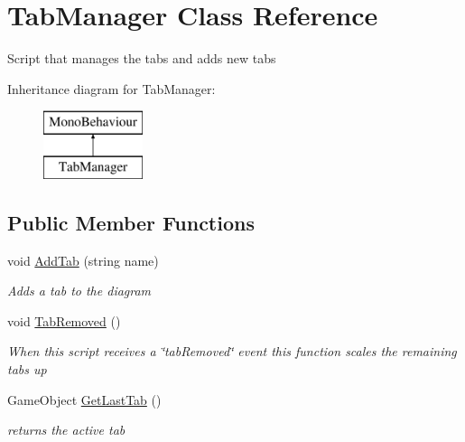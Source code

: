 \hypertarget{class_tab_manager}{}\section{Tab\+Manager Class Reference}
\label{class_tab_manager}


Script that manages the tabs and adds new tabs  


Inheritance diagram for Tab\+Manager\+:\begin{figure}[H]
\begin{center}
\leavevmode
\includegraphics[height=2.000000cm]{class_tab_manager}
\end{center}
\end{figure}
\subsection*{Public Member Functions}
\begin{DoxyCompactItemize}
\item 
void \hyperlink{class_tab_manager_addabe80f37af16c101517e0a4c63fdef}{Add\+Tab} (string name)
\begin{DoxyCompactList}\small\item\em Adds a tab to the diagram \end{DoxyCompactList}\item 
void \hyperlink{class_tab_manager_a060b949fab08f226d44b0daa86e5c424}{Tab\+Removed} ()
\begin{DoxyCompactList}\small\item\em When this script receives a \char`\"{}tab\+Removed\char`\"{} event this function scales the remaining tabs up \end{DoxyCompactList}\item 
Game\+Object \hyperlink{class_tab_manager_a98d132c5a132278fad057a17463f0000}{Get\+Last\+Tab} ()
\begin{DoxyCompactList}\small\item\em returns the active tab \end{DoxyCompactList}\end{DoxyCompactItemize}
